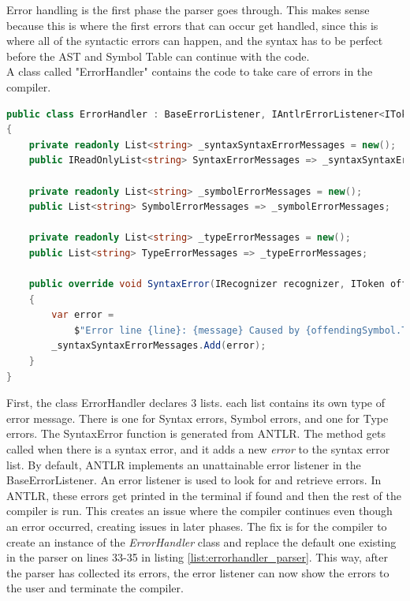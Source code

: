 Error handling is the first phase the parser goes through. This makes sense because this is where the first errors that can occur get handled, since this is where all of the syntactic errors can happen, and the syntax has to be perfect before the AST and Symbol Table can continue with the code.\\
A class called "ErrorHandler" contains the code to take care of errors in the \lang compiler.

\begin{lstlisting}[language = csharp, firstnumber=8, label={list:errorhandler},caption=ErrorHandler - CobraCompiler/ErrorHandler.cs]
public class ErrorHandler : BaseErrorListener, IAntlrErrorListener<IToken>
{
    private readonly List<string> _syntaxSyntaxErrorMessages = new();
    public IReadOnlyList<string> SyntaxErrorMessages => _syntaxSyntaxErrorMessages;

    private readonly List<string> _symbolErrorMessages = new();
    public List<string> SymbolErrorMessages => _symbolErrorMessages;

    private readonly List<string> _typeErrorMessages = new();
    public List<string> TypeErrorMessages => _typeErrorMessages;

    public override void SyntaxError(IRecognizer recognizer, IToken offendingSymbol, int line, int charPositionInLine, string message, RecognitionException e)
    {
        var error =
            $"Error line {line}: {message} Caused by {offendingSymbol.Text}.";
        _syntaxSyntaxErrorMessages.Add(error);
    }
}
\end{lstlisting}

\noindent
First, the class ErrorHandler declares 3 lists. each list contains its own type of error message. There is one for Syntax errors, Symbol errors, and one for Type errors. The SyntaxError function is generated from ANTLR. The method gets called when there is a syntax error, and it adds a new \textit{error} to the syntax error list. By default, ANTLR implements an unattainable error listener in the BaseErrorListener. An error listener is used to look for and retrieve errors. In ANTLR, these errors get printed in the terminal if found and then the rest of the compiler is run. This creates an issue where the compiler continues even though an error occurred, creating issues in later phases. The fix is for the compiler to create an instance of the \textit{ErrorHandler} class and replace the default one existing in the parser on lines 33-35 in listing \ref{list:errorhandler_parser}. This way, after the parser has collected its errors, the error listener can now show the errors to the user and terminate the compiler.

